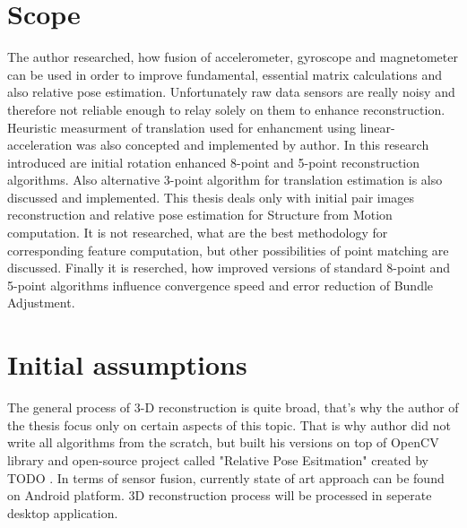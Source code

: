 \section{Scope}
The author researched, how fusion of accelerometer, gyroscope and magnetometer can be used in order to improve fundamental, essential matrix calculations and also relative pose estimation. Unfortunately raw data sensors are really noisy and therefore not reliable enough to relay solely on them to enhance reconstruction. Heuristic measurment of translation used for enhancment using linear-acceleration was also concepted and implemented by author. In this research introduced are  initial rotation enhanced 8-point and 5-point reconstruction algorithms. Also alternative 3-point algorithm for translation estimation is also discussed and implemented.
This thesis deals only with initial pair images reconstruction and relative pose estimation for Structure from Motion computation. It is not researched, what are the best methodology for corresponding feature computation, but other possibilities of point matching are discussed. Finally it is reserched, how improved versions of standard 8-point and 5-point algorithms influence convergence speed and error reduction of Bundle Adjustment.
\section{Initial assumptions}
The general process of 3-D reconstruction is quite broad, that's why the author of the thesis focus only on certain aspects of this topic. That is why author did not write all algorithms from the scratch, but built his versions on top of OpenCV library and open-source project called "Relative Pose Esitmation" created by TODO . In terms of sensor fusion, currently state of art approach can be found on Android platform. 3D reconstruction process will be processed in seperate desktop application.
